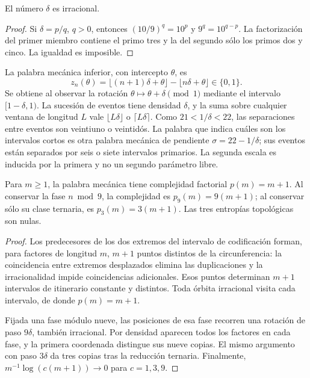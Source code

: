 \begin{lemma}
El número \(\delta\) es irracional.
\end{lemma}
\begin{proof}
Si \(\delta=p/q\), \(q>0\), entonces \((10/9)^q=10^p\) y \(9^q=10^{q-p}\). La factorización del primer miembro contiene el primo tres y la del segundo sólo los primos dos y cinco. La igualdad es imposible.
\end{proof}

La palabra mecánica inferior, con intercepto \(\theta\), es
\[
 z_n(\theta)=\lfloor(n+1)\delta+\theta\rfloor-\lfloor n\delta+\theta\rfloor\in\{0,1\}.
\]
Se obtiene al observar la rotación \(\theta\mapsto\theta+\delta\pmod1\) mediante el intervalo \([1-\delta,1)\). La sucesión de eventos tiene densidad \(\delta\), y la suma sobre cualquier ventana de longitud \(L\) vale \(\lfloor L\delta\rfloor\) o \(\lceil L\delta\rceil\). Como \(21<1/\delta<22\), las separaciones entre eventos son veintiuno o veintidós. La palabra que indica cuáles son los intervalos cortos es otra palabra mecánica de pendiente \(\sigma=22-1/\delta\); sus eventos están separados por seis o siete intervalos primarios. La segunda escala es inducida por la primera y no un segundo parámetro libre.



\begin{theorem}
Para \(m\ge1\), la palabra mecánica tiene complejidad factorial \(p(m)=m+1\). Al conservar la fase \(n\bmod9\), la complejidad es \(p_9(m)=9(m+1)\); al conservar sólo su clase ternaria, es \(p_3(m)=3(m+1)\). Las tres entropías topológicas son nulas.
\end{theorem}
\begin{proof}
Los predecesores de los dos extremos del intervalo de codificación forman, para factores de longitud \(m\), \(m+1\) puntos distintos de la circunferencia: la coincidencia entre extremos desplazados elimina las duplicaciones y la irracionalidad impide coincidencias adicionales. Esos puntos determinan \(m+1\) intervalos de itinerario constante y distintos. Toda órbita irracional visita cada intervalo, de donde \(p(m)=m+1\).

Fijada una fase módulo nueve, las posiciones de esa fase recorren una rotación de paso \(9\delta\), también irracional. Por densidad aparecen todos los factores en cada fase, y la primera coordenada distingue sus nueve copias. El mismo argumento con paso \(3\delta\) da tres copias tras la reducción ternaria. Finalmente, \(m^{-1}\log(c(m+1))\to0\) para \(c=1,3,9\).
\end{proof}

